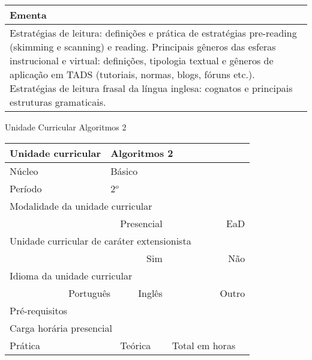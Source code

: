 \begin{quadro}[ht!]
\begin{tabular}{|p{3cm} p{2cm} p{3cm} p{2cm} p{3cm} p{2cm}|}
\multicolumn{6}{|p{15cm}|}{\cellcolor{blue1} Ementa} \\\hline
\hline\multicolumn{6}{|p{15cm}|}{\scriptsize  Estratégias de leitura: definições e prática de estratégias pre-reading (skimming e scanning) e reading. Principais gêneros das esferas instrucional e virtual: definições, tipologia textual e gêneros de aplicação em TADS (tutoriais, normas, blogs, fóruns etc.).  Estratégias de leitura frasal da língua inglesa: cognatos e principais estruturas gramaticais.}\\\hline 
\hline
	\end{tabular}
\end{quadro}


\begin{quadro}[ht!]
  \centering\scriptsize
\caption{Unidade Curricular Algoritmos 2}
\label{unit_6}
\begin{tabular}{|p{3cm} p{2cm} p{3cm} p{2cm} p{3cm} p{2cm}|}\hline
\multicolumn{1}{|p{3cm}|}{\cellcolor{blue1} Unidade curricular} & \multicolumn{5}{p{9cm}|}{Algoritmos 2}\\\hline
\multicolumn{1}{|p{3cm}|}{\cellcolor{blue1} Núcleo} & \multicolumn{5}{p{11.5cm}|}{Básico}\\\hline
\multicolumn{1}{|p{3cm}|}{\cellcolor{blue1} Período} & \multicolumn{5}{p{9cm}|}{2$^o$}\\\hline
\multicolumn{6}{|p{15cm}|}{\cellcolor{blue1} Modalidade da unidade curricular} \\\hline
\multicolumn{2}{|r}{		} &  \multicolumn{2}{r}{Presencial \XBox} & \multicolumn{2}{r|}{EaD \Square	} \\\hline
\multicolumn{6}{|p{15cm}|}{\cellcolor{blue1} Unidade curricular de caráter extensionista} \\\hline
\multicolumn{4}{|r}{			Sim \Square	} & \multicolumn{2}{r|}{	Não \XBox	}\\\hline
\multicolumn{6}{|p{15cm}|}{\cellcolor{blue1} Idioma da unidade curricular} \\ \hline
\multicolumn{2}{|r}{	Português \XBox	} &  \multicolumn{2}{r}{	Inglês \Square	} & \multicolumn{2}{r|}{	Outro \Square	} \\ \hline
\multicolumn{1}{|p{3cm}|}{\cellcolor{blue1} Pré-requisitos} & \multicolumn{5}{p{9cm}|}{}\\ \hline
\multicolumn{6}{|p{15cm}|}{\cellcolor{blue1} Carga horária presencial} \\ \hline
\multicolumn{1}{|p{3cm}|}{\raggedleft Prática} & \multicolumn{1}{p{1cm}|}{\centering	30	} &  \multicolumn{1}{p{3cm}|}{\raggedleft Teórica}  & \multicolumn{1}{p{1cm}|}{\centering 	30	} & \multicolumn{1}{p{3cm}|}{\raggedleft Total em horas} & \multicolumn{1}{p{1cm}|}{\raggedleft	60	} \\ \hline 

\end{tabular}
\end{quadro}
